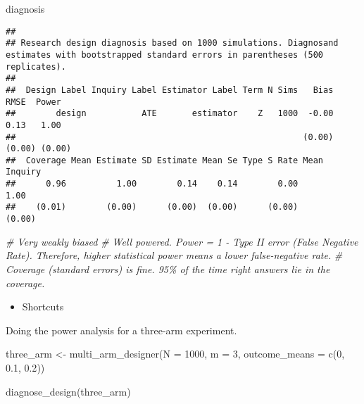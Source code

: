 \documentclass[
]{book}
\newenvironment{Shaded}{\begin{snugshade}}{\end{snugshade}}
\newcommand{\AttributeTok}[1]{\textcolor[rgb]{0.77,0.63,0.00}{#1}}
\newcommand{\CommentTok}[1]{\textcolor[rgb]{0.56,0.35,0.01}{\textit{#1}}}
\newcommand{\DecValTok}[1]{\textcolor[rgb]{0.00,0.00,0.81}{#1}}
\newcommand{\FloatTok}[1]{\textcolor[rgb]{0.00,0.00,0.81}{#1}}
\newcommand{\FunctionTok}[1]{\textcolor[rgb]{0.00,0.00,0.00}{#1}}
\newcommand{\NormalTok}[1]{#1}
\newcommand{\OtherTok}[1]{\textcolor[rgb]{0.56,0.35,0.01}{#1}}
\providecommand{\tightlist}{%
  \setlength{\itemsep}{0pt}\setlength{\parskip}{0pt}}
\begin{document}
\begin{Shaded}
\begin{Highlighting}[]
\NormalTok{diagnosis}
\end{Highlighting}
\end{Shaded}

\begin{verbatim}
## 
## Research design diagnosis based on 1000 simulations. Diagnosand estimates with bootstrapped standard errors in parentheses (500 replicates).
## 
##  Design Label Inquiry Label Estimator Label Term N Sims   Bias   RMSE  Power
##        design           ATE       estimator    Z   1000  -0.00   0.13   1.00
##                                                         (0.00) (0.00) (0.00)
##  Coverage Mean Estimate SD Estimate Mean Se Type S Rate Mean Inquiry
##      0.96          1.00        0.14    0.14        0.00         1.00
##    (0.01)        (0.00)      (0.00)  (0.00)      (0.00)       (0.00)
\end{verbatim}

\begin{Shaded}
\begin{Highlighting}[]
\CommentTok{\# Very weakly biased }
\CommentTok{\# Well powered. Power = 1 {-} Type II error (False Negative Rate). Therefore, higher statistical power means a lower false{-}negative rate. }
\CommentTok{\# Coverage (standard errors) is fine. 95\% of the time right answers lie in the coverage. }
\end{Highlighting}
\end{Shaded}

\begin{itemize}
\tightlist
\item
  Shortcuts
\end{itemize}

Doing the power analysis for a three-arm experiment.

\begin{Shaded}
\begin{Highlighting}[]
\NormalTok{three\_arm }\OtherTok{\textless{}{-}} \FunctionTok{multi\_arm\_designer}\NormalTok{(}\AttributeTok{N =} \DecValTok{1000}\NormalTok{, }\AttributeTok{m =} \DecValTok{3}\NormalTok{, }
                   \AttributeTok{outcome\_means =} \FunctionTok{c}\NormalTok{(}\DecValTok{0}\NormalTok{, }\FloatTok{0.1}\NormalTok{, }\FloatTok{0.2}\NormalTok{))}

\FunctionTok{diagnose\_design}\NormalTok{(three\_arm)}
\end{Highlighting}
\end{Shaded}
\end{document}
